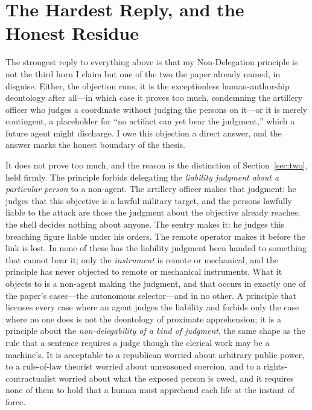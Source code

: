 \documentclass[11pt]{article}
\begin{document}
\section{The Hardest Reply, and the Honest Residue}
\label{sec:residue}

The strongest reply to everything above is that my Non-Delegation principle is not the third horn I claim but one of the two the paper already named, in disguise. Either, the objection runs, it is the exceptionless human-authorship deontology after all---in which case it proves too much, condemning the artillery officer who judges a coordinate without judging the persons on it---or it is merely contingent, a placeholder for ``no artifact can yet bear the judgment,'' which a future agent might discharge. I owe this objection a direct answer, and the answer marks the honest boundary of the thesis.

It does not prove too much, and the reason is the distinction of Section~\ref{sec:two}, held firmly. The principle forbids delegating the \emph{liability judgment about a particular person} to a non-agent. The artillery officer makes that judgment: he judges that this objective is a lawful military target, and the persons lawfully liable to the attack are those the judgment about the objective already reaches; the shell decides nothing about anyone. The sentry makes it: he judges this breaching figure liable under his orders. The remote operator makes it before the link is lost. In none of these has the liability judgment been handed to something that cannot bear it; only the \emph{instrument} is remote or mechanical, and the principle has never objected to remote or mechanical instruments. What it objects to is a non-agent making the judgment, and that occurs in exactly one of the paper's cases---the autonomous selector---and in no other. A principle that licenses every case where an agent judges the liability and forbids only the case where no one does is not the deontology of proximate apprehension; it is a principle about the \emph{non-delegability of a kind of judgment}, the same shape as the rule that a sentence requires a judge though the clerical work may be a machine's. It is acceptable to a republican worried about arbitrary public power, to a rule-of-law theorist worried about unreasoned coercion, and to a rights-contractualist worried about what the exposed person is owed, and it requires none of them to hold that a human must apprehend each life at the instant of force.
\end{document}
